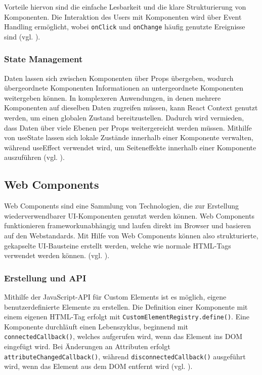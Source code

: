 \documentclass[oneside]{ausarbeitung}
\begin{document}
Vorteile hiervon sind die einfache Lesbarkeit und die klare Strukturierung von Komponenten.  
Die Interaktion des Users mit Komponenten wird über Event Handling ermöglicht, wobei \texttt{onClick} und \texttt{onChange} häufig genutzte Ereignisse sind (vgl. \parencite{react}).

\subsubsection{State Management}
Daten lassen sich zwischen Komponenten über Props übergeben, wodurch übergeordnete Komponenten Informationen an untergeordnete Komponenten weitergeben können. In komplexeren Anwendungen, in denen mehrere Komponenten auf dieselben Daten zugreifen müssen, kann React Context genutzt werden, um einen globalen Zustand bereitzustellen. Dadurch wird vermieden, dass Daten über viele Ebenen per Props weitergereicht werden müssen. Mithilfe von useState lassen sich lokale Zustände innerhalb einer Komponente verwalten, während useEffect verwendet wird, um Seiteneffekte innerhalb einer Komponente auszuführen (vgl. \parencite{react}).

\subsection{Web Components}
Web Components sind eine Sammlung von Technologien, die zur Erstellung wiederverwendbarer UI-Komponenten genutzt werden können. Web Components funktionieren frameworkunabhängig und laufen direkt im Browser und basieren auf den Webstandards. Mit Hilfe von Web Components können also strukturierte, gekapselte UI-Bausteine erstellt werden, welche wie normale \ac{HTML}-Tags verwendet werden können. (vgl. \parencite{webcomponents}). 

\subsubsection{Erstellung und API}
Mithilfe der JavaScript-API für Custom Elements ist es möglich, eigene benutzerdefinierte Elemente zu erstellen. Die Definition einer Komponente mit einem eigenen \ac{HTML}-Tag erfolgt mit \texttt{CustomElementRegistry.define()}. Eine Komponente durchläuft einen Lebenszyklus, beginnend mit \texttt{connectedCallback()}, welches aufgerufen wird, wenn das Element ins DOM eingefügt wird. Bei Änderungen an Attributen erfolgt \texttt{attributeChangedCallback()}, während \texttt{disconnectedCallback()} ausgeführt wird, wenn das Element aus dem DOM entfernt wird (vgl. \parencite{webcomponents}).
\end{document}
